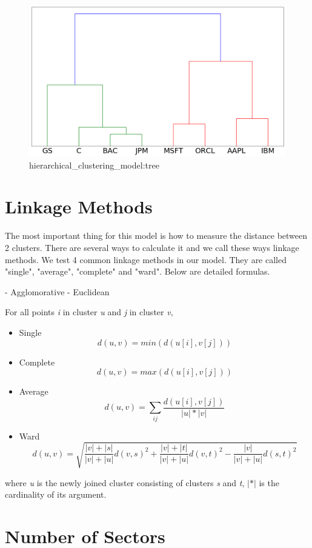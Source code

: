\documentclass[../main.tex]{subfiles}
\begin{document}
{\begin{figure}[H]
    \centering
    \includegraphics[scale=0.4]{images/tree.png}
    \caption{hierarchical_clustering_model:tree}
    \label{fig:hierarchical_clustering_model:tree}
\end{figure}

\section{Linkage Methods}

The most important thing for this model is how to measure the distance between 2 clusters. There are several ways to calculate it and we call these ways linkage methods. We test 4 common linkage methods in our model. They are called "single", "average", "complete" and "ward". Below are detailed formulas.


- Agglomorative
- Euclidean

For all points \textit{i} in cluster \textit{u} and \textit{j} in cluster \textit{v},
\begin{itemize}
\item Single
$$ d(u,v) = min(d(u[i],v[j])) $$
\item Complete
$$ d(u,v) = max(d(u[i],v[j])) $$
\item Average
$$ d(u,v) = \sum_{ij}{\frac{d(u[i],v[j])}{|u|*|v|}} $$
\item Ward
$$ d(u,v) = \sqrt{\frac{|v|+|s|}{|v|+|u|}d(v,s)^2 + \frac{|v|+|t|}{|v|+|u|}d(v,t)^2 - \frac{|v|}{|v|+|u|}d(s,t)^2} $$
\end{itemize}
where \textit{u} is the newly joined cluster consisting of clusters \textit{s} and \textit{t}, $|*|$ is the cardinality of its argument.

\section{Number of Sectors}

}
\end{document}
